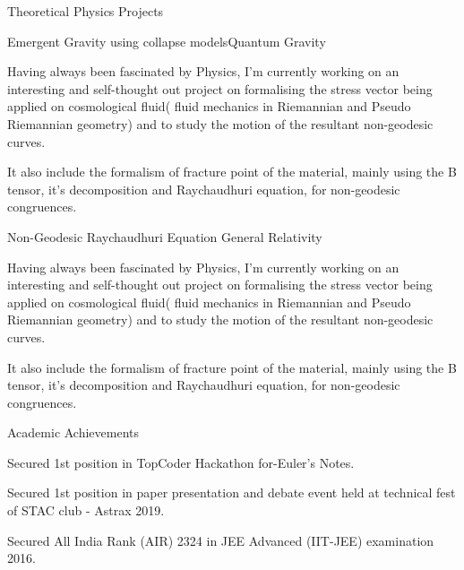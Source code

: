 \documentclass{resume} %
\begin{document}
\begin{rSection}{Theoretical Physics Projects}
\begin{rSubsection}{Emergent Gravity using collapse models}{Quantum Gravity}{}{}
\item Having always been fascinated by Physics, I’m currently working on an interesting and self-thought out project on formalising the stress vector being applied on cosmological fluid( fluid mechanics in Riemannian and Pseudo Riemannian geometry) and to study the motion of the resultant non-geodesic curves. 
\item It also include the formalism of fracture point of the material, mainly using the B tensor, it’s decomposition and Raychaudhuri equation, for non-geodesic congruences.

\end{rSubsection}
\begin{rSubsection}{Non-Geodesic Raychaudhuri Equation }{General Relativity}{}{}
\item Having always been fascinated by Physics, I’m currently working on an interesting and self-thought out project on formalising the stress vector being applied on cosmological fluid( fluid mechanics in Riemannian and Pseudo Riemannian geometry) and to study the motion of the resultant non-geodesic curves. 
\item It also include the formalism of fracture point of the material, mainly using the B tensor, it’s decomposition and Raychaudhuri equation, for non-geodesic congruences.

\end{rSubsection}
\end{rSection}

\newpage
\begin{rSection}{Academic Achievements}
\item Secured 1st position in TopCoder Hackathon for-Euler’s Notes.
\item Secured 1st position in paper presentation and debate event held at technical fest of STAC club - Astrax 2019.
\item Secured All India Rank (AIR) 2324 in JEE Advanced (IIT-JEE) examination 2016.  
\end{rSection}
\end{document}
